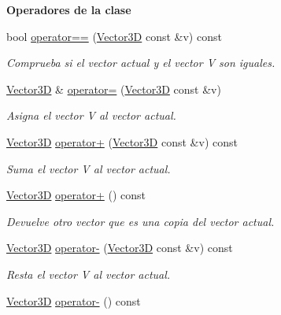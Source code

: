 \begin{Indent}\textbf{ Operadores de la clase}\par
\begin{DoxyCompactItemize}
\item 
bool \mbox{\hyperlink{classed_1_1Vector3D_a09cbd7f5d848a95b652be1a66703710f}{operator==}} (\mbox{\hyperlink{classed_1_1Vector3D}{Vector3D}} const \&v) const
\begin{DoxyCompactList}\small\item\em Comprueba si el vector actual y el vector V son iguales. \end{DoxyCompactList}\item 
\mbox{\hyperlink{classed_1_1Vector3D}{Vector3D}} \& \mbox{\hyperlink{classed_1_1Vector3D_afc9b1243cc26a4f20cf6e05f7e4dd8cc}{operator=}} (\mbox{\hyperlink{classed_1_1Vector3D}{Vector3D}} const \&v)
\begin{DoxyCompactList}\small\item\em Asigna el vector V al vector actual. \end{DoxyCompactList}\item 
\mbox{\hyperlink{classed_1_1Vector3D}{Vector3D}} \mbox{\hyperlink{classed_1_1Vector3D_a8bd997d7786abcc49ae5f2f6f4e44db6}{operator+}} (\mbox{\hyperlink{classed_1_1Vector3D}{Vector3D}} const \&v) const
\begin{DoxyCompactList}\small\item\em Suma el vector V al vector actual. \end{DoxyCompactList}\item 
\mbox{\hyperlink{classed_1_1Vector3D}{Vector3D}} \mbox{\hyperlink{classed_1_1Vector3D_a0b5d720dcaf6e5f4211179ee973b0ae8}{operator+}} () const
\begin{DoxyCompactList}\small\item\em Devuelve otro vector que es una copia del vector actual. \end{DoxyCompactList}\item 
\mbox{\hyperlink{classed_1_1Vector3D}{Vector3D}} \mbox{\hyperlink{classed_1_1Vector3D_ab7fb56356289e2cd6c96700dcf35607c}{operator-\/}} (\mbox{\hyperlink{classed_1_1Vector3D}{Vector3D}} const \&v) const
\begin{DoxyCompactList}\small\item\em Resta el vector V al vector actual. \end{DoxyCompactList}\item 
\mbox{\hyperlink{classed_1_1Vector3D}{Vector3D}} \mbox{\hyperlink{classed_1_1Vector3D_aab00bcab59786a685b95fb12f8909e28}{operator-\/}} () const

\end{DoxyCompactItemize}
\end{Indent}
